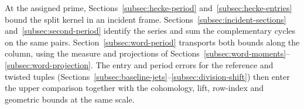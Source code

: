 At the assigned prime, Sections~\ref{subsec:hecke-period} and~\ref{subsec:hecke-entries} bound the split kernel in an incident frame. Sections~\ref{subsec:incident-sections} and~\ref{subsec:second-period} identify the series and sum the complementary cycles on the same pairs. Section~\ref{subsec:word-period} transports both bounds along the column, using the measure and projections of Sections~\ref{subsec:word-moments}--\ref{subsec:word-projection}. The entry and period errors for the reference and twisted tuples (Sections~\ref{subsec:baseline-jets}--\ref{subsec:division-shift}) then enter the upper comparison together with the cohomology, lift, row-index and geometric bounds at the same scale. \label{cor:family-window-4}
